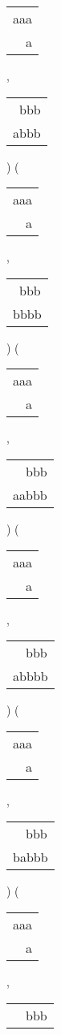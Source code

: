 \begin{description}
\begin{tabular}{|l|}
aaa \\
\ \ a \\
\hline
\end{tabular} 
 , 
\begin{tabular}{|l|} \hline
\ bbb \\
abbb \\
\hline
\end{tabular} 
) 
 ( 
\begin{tabular}{|l|} \hline
aaa \\
\ \ a \\
\hline
\end{tabular} 
 , 
\begin{tabular}{|l|} \hline
\ bbb \\
bbbb \\
\hline
\end{tabular} 
) 
 ( 
\begin{tabular}{|l|} \hline
aaa \\
\ \ a \\
\hline
\end{tabular} 
 , 
\begin{tabular}{|l|} \hline
\ \ bbb \\
aabbb \\
\hline
\end{tabular} 
) 
 ( 
\begin{tabular}{|l|} \hline
aaa \\
\ \ a \\
\hline
\end{tabular} 
 , 
\begin{tabular}{|l|} \hline
\ \ bbb \\
abbbb \\
\hline
\end{tabular} 
) 
 ( 
\begin{tabular}{|l|} \hline
aaa \\
\ \ a \\
\hline
\end{tabular} 
 , 
\begin{tabular}{|l|} \hline
\ \ bbb \\
babbb \\
\hline
\end{tabular} 
) 
 ( 
\begin{tabular}{|l|} \hline
aaa \\
\ \ a \\
\hline
\end{tabular} 
 , 
\begin{tabular}{|l|} \hline
\ \ bbb \\

\end{tabular}
\end{description}
